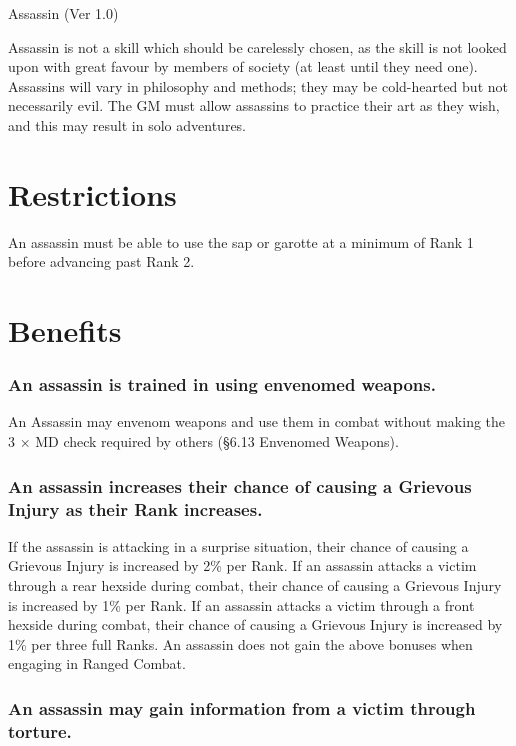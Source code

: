 \begin{Chapter}{Assassin (Ver 1.0)}

Assassin is not a skill which should be carelessly chosen, as the
skill is not looked upon with great favour by members of society (at
least until they need one).  Assassins will vary in philosophy and
methods; they may be cold-hearted but not necessarily evil.  The GM
must allow assassins to practice their art as they wish, and this may
result in solo adventures.

\section{Restrictions}

An assassin must be able to use the sap or garotte at a minimum of
Rank 1 before advancing past Rank 2.

\section{Benefits}

\subsubsection{An assassin is trained in using envenomed weapons.}

An Assassin may envenom weapons and use them in combat without making
the 3 × MD check required by others (§6.13 Envenomed Weapons).

\subsubsection{An assassin increases their chance of causing a Grievous Injury as
their Rank increases.}

If the assassin is attacking in a surprise situation, their chance of
causing a Grievous Injury is increased by 2\% per Rank.  If an
assassin attacks a victim through a rear hexside during combat, their
chance of causing a Grievous Injury is increased by 1\% per Rank.  If
an assassin attacks a victim through a front hexside during combat,
their chance of causing a Grievous Injury is increased by 1\% per
three full Ranks. An assassin does not gain the above bonuses when
engaging in Ranged Combat.


\subsubsection{An assassin may gain information from a victim through torture.}


\end{Chapter}
